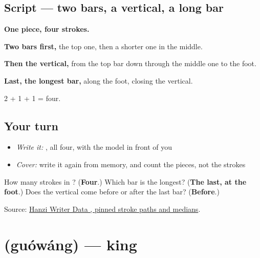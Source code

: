 \subsection*{Script — two bars, a vertical, a long bar}

\begin{quote}
\end{quote}

\textbf{One piece, four strokes.}

\textbf{Two bars first,} the top one, then a shorter one in the middle.

\textbf{Then the vertical,} from the top bar down through the middle one to the foot.

\textbf{Last, the longest bar,} along the foot, closing the vertical.

2 + 1 + 1 = four.

\subsection*{Your turn}
\begin{itemize}
\raggedright
  \item \emph{Write it:} , all four, with the model in front of you
  \item \emph{Cover:} write it again from memory, and count the pieces, not the strokes
\end{itemize}

\begin{tcolorbox}[breakable,colback=teal!4,colframe=teal!35!black,title={Before you move on}]
How many strokes in ? (\textbf{Four}.) Which bar is the longest? (\textbf{The last, at the foot}.) Does the vertical come before or after the last bar? (\textbf{Before}.)

Source: \href{https://raw.githubusercontent.com/chanind/hanzi-writer-data/68d10a4b21150cae5e1ebbd223eed289cf32d90c/data/\%E7\%8E\%8B.json}{Hanzi Writer Data , pinned stroke paths and medians}.
\end{tcolorbox}
\section[\texorpdfstring{\zh{国王} (guówáng)}{国王 (guówáng)}]{ (guówáng) — king}

\label{lesson:ZH-C330-guowang}



